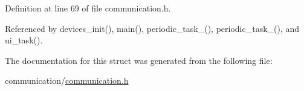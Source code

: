 Definition at line 69 of file communication.\-h.



Referenced by devices\-\_\-init(), main(), periodic\-\_\-task\-\_(), periodic\-\_\-task\-\_(), and ui\-\_\-task().



The documentation for this struct was generated from the following file\-:\begin{DoxyCompactItemize}
\item 
communication/\hyperlink{communication_2communication_8h}{communication.\-h}\end{DoxyCompactItemize}
